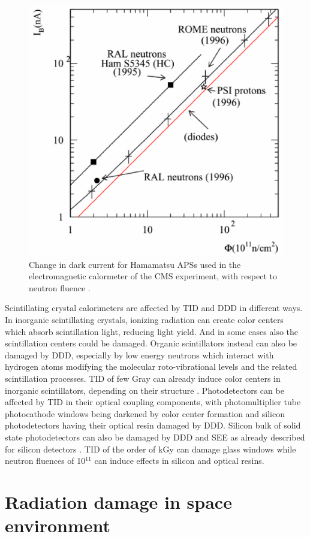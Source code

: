 \documentclass[twoside,a4paper]{article}
\begin{document}
\begin{figure}[h!]
\includegraphics  [width = 0.8  \textwidth] {cmsapd.eps}
\caption{Change in dark current for Hamamatsu APSs used in the electromagnetic calormeter of the CMS experiment, with respect to neutron fluence \cite{CMS}.}
\label{fig:apd}
\end{figure}

Scintillating crystal calorimeters are affected by TID and DDD in different ways. In inorganic scintillating crystals, ionizing radiation can create color centers which absorb scintillation light, reducing light yield. And in some cases also the scintillation centers could be damaged. Organic scintillators instead can also be damaged by DDD, especially by low energy neutrons which interact with hydrogen atoms modifying the molecular roto-vibrational levels and the related scintillation processes. TID of few Gray can already induce color centers in inorganic scintillators, depending on their structure \cite{zhu}. 
Photodetectors can be affected by TID in their optical coupling components, with photomultiplier tube photocathode windows being darkened by color center formation and silicon photodetectors having their optical resin damaged by DDD. Silicon bulk of solid state photodetectors can also be damaged by DDD and SEE as already described for silicon detectors \cite{CMS}. TID of the order of kGy can damage glass windows while neutron fluences of 10$^{11}$ can induce effects in silicon and optical resins.



\section{Radiation damage in space environment}
\end{document}
